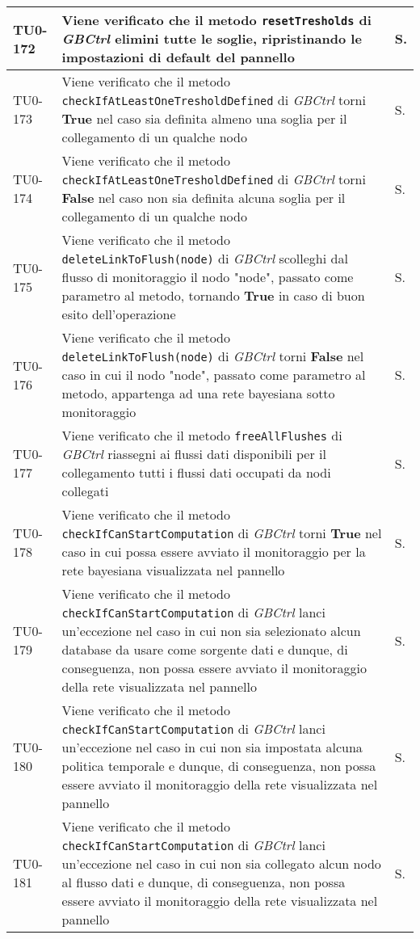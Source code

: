\begin{longtable}{|C{.15\textwidth}|m{.66\textwidth}|C{.10\textwidth}|}
TU0-172 & Viene verificato che il metodo \texttt{resetTresholds} di \textit{GBCtrl} elimini tutte le soglie, ripristinando le impostazioni di default del pannello & S.\\
\hline
{}TU0-173 & Viene verificato che il metodo \texttt{checkIfAtLeastOneTresholdDefined} di \textit{GBCtrl} torni \textbf{True} nel caso sia definita almeno una soglia per il collegamento di un qualche nodo & S.\\
\hline
TU0-174 & Viene verificato che il metodo \texttt{checkIfAtLeastOneTresholdDefined} di \textit{GBCtrl} torni \textbf{False} nel caso non sia definita alcuna soglia per il collegamento di un qualche nodo & S.\\
\hline
{}TU0-175 & Viene verificato che il metodo \texttt{deleteLinkToFlush(node)} di \textit{GBCtrl} scolleghi dal flusso di monitoraggio il nodo "node", passato come parametro al metodo, tornando \textbf{True} in caso di buon esito dell'operazione & S.\\
\hline
TU0-176 & Viene verificato che il metodo \texttt{deleteLinkToFlush(node)} di \textit{GBCtrl} torni \textbf{False} nel caso in cui il nodo "node", passato come parametro al metodo, appartenga ad una rete bayesiana sotto monitoraggio & S.\\
\hline
{}TU0-177 & Viene verificato che il metodo \texttt{freeAllFlushes} di \textit{GBCtrl} riassegni ai flussi dati disponibili per il collegamento tutti i flussi dati occupati da nodi collegati & S.\\
\hline
TU0-178 & Viene verificato che il metodo \texttt{checkIfCanStartComputation} di \textit{GBCtrl} torni \textbf{True} nel caso in cui possa essere avviato il monitoraggio per la rete bayesiana visualizzata nel pannello & S.\\
\hline
{}TU0-179 & Viene verificato che il metodo \texttt{checkIfCanStartComputation} di \textit{GBCtrl} lanci un'eccezione nel caso in cui non sia selezionato alcun database da usare come sorgente dati e dunque, di conseguenza, non possa essere avviato il monitoraggio della rete visualizzata nel pannello & S.\\
\hline
TU0-180 & Viene verificato che il metodo \texttt{checkIfCanStartComputation} di \textit{GBCtrl} lanci un'eccezione nel caso in cui non sia impostata alcuna politica temporale e dunque, di conseguenza, non possa essere avviato il monitoraggio della rete visualizzata nel pannello & S.\\
\hline
{}TU0-181 & Viene verificato che il metodo \texttt{checkIfCanStartComputation} di \textit{GBCtrl} lanci un'eccezione nel caso in cui non sia collegato alcun nodo al flusso dati e dunque, di conseguenza, non possa essere avviato il monitoraggio della rete visualizzata nel pannello & S.\\

\end{longtable}
